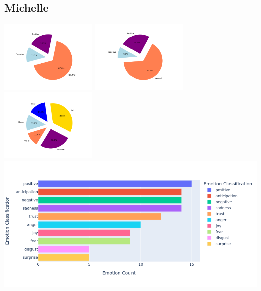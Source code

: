 \documentclass[a4paper,12pt]{article}
\begin{document}
	\subsection{Michelle}
	{\includegraphics[height=3.5cm]{michellesVaderEmotionalPie.png}}
	{\includegraphics[height=3.5cm]{michellesBlobEmotionalPie.png}}
	{\includegraphics[height=3.5cm]{michellesEmotionalPie.png}}\\
	{\includegraphics[width=17cm]{michelleNrcImage.png}}\\
	\clearpage
\end{document}
